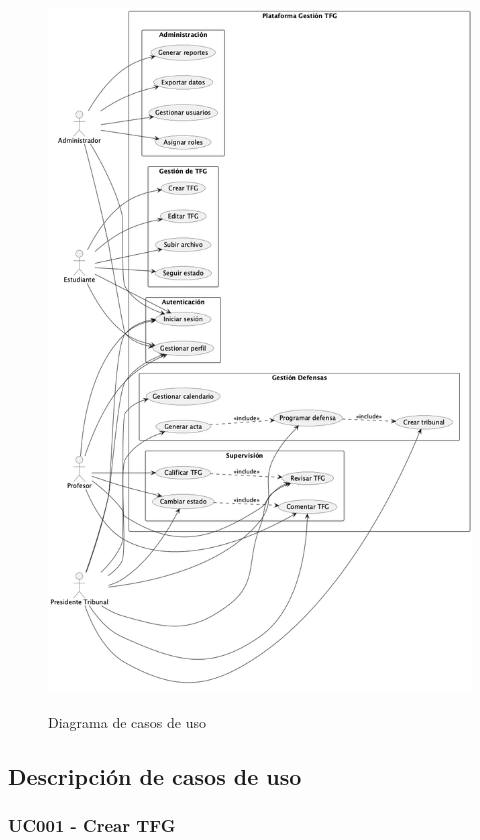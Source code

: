 \documentclass[12pt,a4paper,oneside]{report}
\providecommand{\pandocbounded}[1]{#1}
\begin{document}
\begin{figure}[H]
\centering
\pandocbounded{\includegraphics[keepaspectratio,alt={Diagrama de casos de uso}]{processed/images/04_analisis_sistema_plantuml_0.png}}
\caption{Diagrama de casos de uso}
\label{fig:diagrama-casos-uso}
\end{figure}

\subsection{Descripción de casos de
uso}\label{descripciuxf3n-de-casos-de-uso}

\subsubsection{UC001 - Crear TFG}\label{uc001---crear-tfg}
\end{document}
